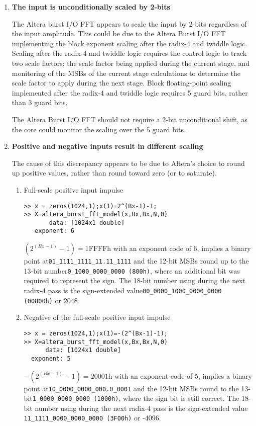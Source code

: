 \begin{enumerate}
\item \textbf{The input is unconditionally scaled by 2-bits}

The Altera burst I/O FFT appears to scale the input by 2-bits regardless
of the input amplitude. This could be due to the Altera Burst I/O
FFT implementing the block exponent scaling after the radix-4 and twiddle
logic. Scaling after the radix-4 and twiddle logic requires the control
logic to track two scale factors; the scale factor being applied during
the current stage, and monitoring of the MSBs of the current stage
calculations to determine the scale factor to apply during the next stage.
Block floating-point scaling implemented after the radix-4 and twiddle
logic requires 5 guard bits, rather than 3 guard bits.

The Altera Burst I/O FFT should not require a 2-bit unconditional shift,
as the core could monitor the scaling over the 5 guard bits.

\item \textbf{Positive and negative inputs result in different scaling}

The cause of this discrepancy appears to be due to Altera's choice to
round up positive values, rather than round toward zero (or to saturate).

\begin{enumerate}
\item Full-scale positive input impulse
%
\begin{verbatim}
>> x = zeros(1024,1);x(1)=2^(Bx-1)-1;
>> X=altera_burst_fft_model(x,Bx,Bx,N,0)
       data: [1024x1 double]
   exponent: 6
\end{verbatim}
%
$(2^{(Bx-1)}-1) = \text{1FFFFh}$ with an exponent code of 6, implies a
binary point at\newline \verb+01_1111_1111_11.11_1111+ and the 12-bit
MSBs round up to the 13-bit number\newline \verb+0_1000_0000_0000 (800h)+,
where an additional bit was required to represent the sign. The 18-bit
number using during the next radix-4 pass is the sign-extended
value\newline\verb+00_0000_1000_0000_0000 (00800h)+ or 2048.

\item Negative of the full-scale positive input impulse
%
\begin{verbatim}
>> x = zeros(1024,1);x(1)=-(2^(Bx-1)-1);
>> X=altera_burst_fft_model(x,Bx,Bx,N,0)
      data: [1024x1 double]
  exponent: 5
\end{verbatim}
%
$-(2^{(Bx-1)}-1) = \text{20001h}$ with an exponent code of 5, implies a
binary point at\newline \verb+10_0000_0000_000.0_0001+ and the 12-bit
MSBs round to the 13-bit\newline \verb+1_0000_0000_0000 (1000h)+, where
the sign bit is still correct. The 18-bit number using during the next
radix-4 pass is the sign-extended value \verb+11_1111_0000_0000_0000 (3F00h)+ or -4096.
\end{enumerate}


\end{enumerate}
